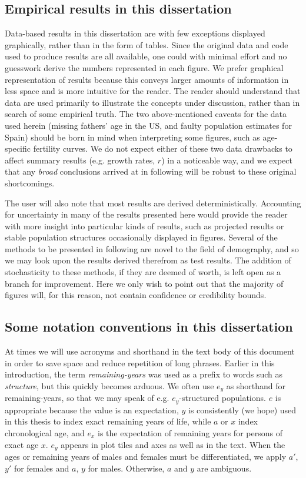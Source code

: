 \subsection{Empirical results in this dissertation}

Data-based results in this dissertation are with few exceptions displayed
graphically, rather than in the form of tables. Since the original data and
code used to produce results are all available, one could with minimal effort
and no guesswork derive the numbers represented in each figure. We prefer
graphical representation of results because this conveys larger amounts of
information in less space and is more intuitive for the reader. The reader
should understand that data are used primarily to illustrate the concepts under discussion, rather
than in search of some empirical truth. The two
above-mentioned caveats for the data used herein (missing fathers' age in the
US, and faulty population estimates for Spain) should be born in mind when
interpreting some figures, such as age-specific fertility curves. We do not
expect either of these two data drawbacks to affect summary results 
(e.g. growth rates, $r$) in a noticeable way, and we expect that any
\textit{broad} conclusions arrived at in following will be robust to these
original shortcomings. 

The user will also note that most results are derived deterministically.
Accounting for uncertainty in many of the results presented here would provide
the reader with more insight into particular kinds of results, such as projected
results or stable population structures occasionally displayed in figures.
Several of the methods to be presented in following are novel to the field of
demography, and so we may look upon the results derived therefrom as test
results. The addition of stochasticity to these methods, if they are deemed of
worth, is left open as a branch for improvement. Here we only wish to point out
that the majority of figures will, for this reason, not contain confidence or
credibility bounds.

\subsection{Some notation conventions in this dissertation}
At times we will use acronyms and shorthand in the text body of this document in
order to save space and reduce repetition of long phrases. Earlier in this
introduction, the term \textit{remaining-years} was used as a prefix to words
such as \textit{structure}, but this quickly becomes arduous. We often use $e_y$
as shorthand for remaining-years, so that we may speak of e.g. $e_y$-structured
populations. $e$ is appropriate because the value is an expectation, $y$ is
consistently (we hope) used in this thesis to index exact remaining years of
life, while $a$ or $x$ index chronological age, and $e_x$ is the expectation of 
remaining years for persons of exact age $x$. $e_y$ appears in plot tiles and
axes as well as in the text. When the ages or remaining years of males and
females must be differentiated, we apply $a'$, $y'$ for females and $a$, $y$ for
males. Otherwise, $a$ and $y$ are ambiguous.

